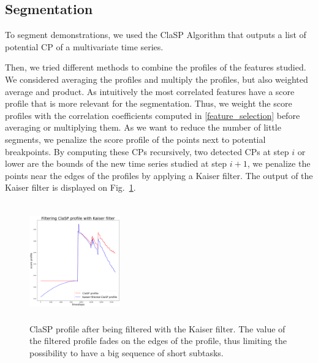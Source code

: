 \documentclass[conference]{IEEEtran}
\begin{document}

\subsection{Segmentation} \label{method_segmentation}

To segment demonstrations, we used the  ClaSP Algorithm that outputs a list  of potential CP of a multivariate time series. 

Then, we tried different methods to combine the profiles of the features studied. We considered averaging the profiles and multiply the profiles, but also weighted average and product. As intuitively the most correlated features have a score profile that is more relevant for the segmentation. Thus, we weight the score profiles with the correlation coefficients computed in \ref{feature_selection} before averaging or multiplying them. As we want to reduce the number of little segments, we penalize the score profile of the points next to potential breakpoints. By computing these CPs recursively, two detected CPs at step $i$ or lower are the bounds of the new time series studied at step $i+1$, we penalize the points near the edges of the profiles by applying a Kaiser filter. The output of the Kaiser filter is displayed on Fig.~\ref{fig:Kaiser}.

\begin{figure}[t]
  \centering
  \includegraphics[width=0.35\textwidth, height=2in]{img/resolKaiser.png}
  \caption{ClaSP profile after being filtered with the Kaiser filter. The value of the filtered profile fades on the edges of the profile, thus limiting the possibility to have a big sequence of short subtasks.}
  \label{fig:Kaiser}
\end{figure}
\end{document}
